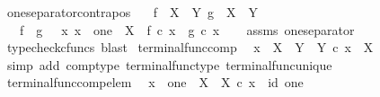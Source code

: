 \begin{isabellebody}
\isanewline
{}\isamarkupfalse%
\ one{\isacharunderscore}{\kern0pt}separator{\isacharunderscore}{\kern0pt}contrapos{\isacharcolon}{\kern0pt}\isanewline
\ \ \ {\isachardoublequoteopen}f\ {\isacharcolon}{\kern0pt}\ X\ {\isasymrightarrow}\ Y{\isachardoublequoteclose}\ {\isachardoublequoteopen}g\ {\isacharcolon}{\kern0pt}\ X\ {\isasymrightarrow}\ Y{\isachardoublequoteclose}\isanewline
\ \ \ {\isachardoublequoteopen}f\ {\isasymnoteq}\ g\ {\isasymLongrightarrow}\ {\isasymexists}\ x{\isachardot}{\kern0pt}\ x\ {\isacharcolon}{\kern0pt}\ one\ {\isasymrightarrow}\ X\ {\isasymand}\ f\ {\isasymcirc}\isactrlsub c\ x\ {\isasymnoteq}\ g\ {\isasymcirc}\isactrlsub c\ x{\isachardoublequoteclose}\isanewline
%
\isadelimproof
\ \ %
\endisadelimproof
%
\isatagproof
{}\isamarkupfalse%
\ assms\ one{\isacharunderscore}{\kern0pt}separator\ \isamarkupfalse%
\ {\isacharparenleft}{\kern0pt}typecheck{\isacharunderscore}{\kern0pt}cfuncs{\isacharcomma}{\kern0pt}\ blast{\isacharparenright}{\kern0pt}%
\endisatagproof
{\isafoldproof}%
%
\isadelimproof
\isanewline
%
\endisadelimproof
\isanewline
{}\isamarkupfalse%
\ terminal{\isacharunderscore}{\kern0pt}func{\isacharunderscore}{\kern0pt}comp{\isacharcolon}{\kern0pt}\isanewline
\ \ {\isachardoublequoteopen}x\ {\isacharcolon}{\kern0pt}\ X\ {\isasymrightarrow}\ Y\ {\isasymLongrightarrow}\ {\isasymbeta}\isactrlbsub Y\isactrlesub \ {\isasymcirc}\isactrlsub c\ x\ {\isacharequal}{\kern0pt}\ {\isasymbeta}\isactrlbsub X\isactrlesub {\isachardoublequoteclose}\isanewline
%
\isadelimproof
\ \ %
\endisadelimproof
%
\isatagproof
{}\isamarkupfalse%
\ {\isacharparenleft}{\kern0pt}simp\ add{\isacharcolon}{\kern0pt}\ comp{\isacharunderscore}{\kern0pt}type\ terminal{\isacharunderscore}{\kern0pt}func{\isacharunderscore}{\kern0pt}type\ terminal{\isacharunderscore}{\kern0pt}func{\isacharunderscore}{\kern0pt}unique{\isacharparenright}{\kern0pt}%
\endisatagproof
{\isafoldproof}%
%
\isadelimproof
\isanewline
%
\endisadelimproof
\isanewline
{}\isamarkupfalse%
\ terminal{\isacharunderscore}{\kern0pt}func{\isacharunderscore}{\kern0pt}comp{\isacharunderscore}{\kern0pt}elem{\isacharcolon}{\kern0pt}\isanewline
\ \ {\isachardoublequoteopen}x\ {\isacharcolon}{\kern0pt}\ one\ {\isasymrightarrow}\ X\ {\isasymLongrightarrow}\ {\isasymbeta}\isactrlbsub X\isactrlesub \ {\isasymcirc}\isactrlsub c\ x\ {\isacharequal}{\kern0pt}\ id\ one{\isachardoublequoteclose}\isanewline
%
\isadelimproof
\ \ %
\endisadelimproof
%
\isatagproof
{}\isamarkupfalse%

\end{isabellebody}

